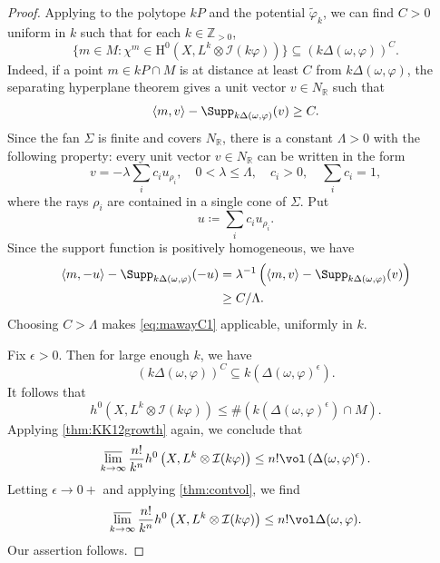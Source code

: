 \begin{proof}
    Applying  to the polytope $kP$ and the potential $\widetilde\varphi_k$, we can find $C>0$ uniform in $k$ such that for each $k\in \mathbb{Z}_{>0}$,
    \[
    \bigl\{ m\in M:\chi^m\in\mathrm{H}^0(X,L^k\otimes\mathcal{I}(k\varphi))\bigr\}
    \subseteq \left(k\Delta(\omega,\varphi)\right)^C.
    \]
    Indeed, if a point $m\in kP\cap M$ is at distance at least $C$ from $k\Delta(\omega,\varphi)$, the separating hyperplane theorem gives a unit vector $v\in N_{\mathbb R}$ such that
    \[
        \langle m,v\rangle-\Supp_{k\Delta(\omega,\varphi)}(v)\geq C.
    \]
    Since the fan $\Sigma$ is finite and covers $N_{\mathbb R}$, there is a constant $\Lambda>0$ with the following property: every unit vector $v\in N_{\mathbb R}$ can be written in the form
    \[
        v=-\lambda\sum_i c_i u_{\rho_i},\quad 0<\lambda\leq\Lambda,\quad c_i>0,\quad \sum_i c_i=1,
    \]
    where the rays $\rho_i$ are contained in a single cone of $\Sigma$.
    Put
    \[
        u\coloneqq \sum_i c_i u_{\rho_i}.
    \]
    Since the support function is positively homogeneous, we have
    \[
    \begin{aligned}
    \langle m,-u\rangle-\Supp_{k\Delta(\omega,\varphi)}(-u)&=\lambda^{-1}\left(\langle m,v\rangle-\Supp_{k\Delta(\omega,\varphi)}(v)\right)\\
    &\geq C/\Lambda.
    \end{aligned}
    \]
    Choosing $C>\Lambda$ makes \eqref{eq:mawayC1} applicable, uniformly in $k$.

    Fix $\epsilon>0$. Then for large enough $k$, we have
    \[
    \left(k\Delta(\omega,\varphi)\right)^{C}\subseteq k\left(\Delta(\omega,\varphi)^{\epsilon}\right).
    \]
    It follows that
    \[
    h^0\left(X,L^k\otimes \mathcal{I}(k\varphi)\right)\leq \# \left( k\left(\Delta(\omega,\varphi)^{\epsilon}\right) \cap M\right).
    \]
    Applying \cref{thm:KK12growth} again, we conclude that
    \[
    \varlimsup_{k\to\infty} \frac{n!}{k^n} h^0\left(X,L^k\otimes \mathcal{I}(k\varphi)\right)\leq n! \vol\left(\Delta(\omega,\varphi)^{\epsilon}\right).
    \]
    Letting $\epsilon\to 0+$ and applying \cref{thm:contvol}, we find
    \[
    \varlimsup_{k\to\infty} \frac{n!}{k^n} h^0\left(X,L^k\otimes \mathcal{I}(k\varphi)\right)\leq n! \vol \Delta(\omega,\varphi).
    \]
    Our assertion follows.
\end{proof}

